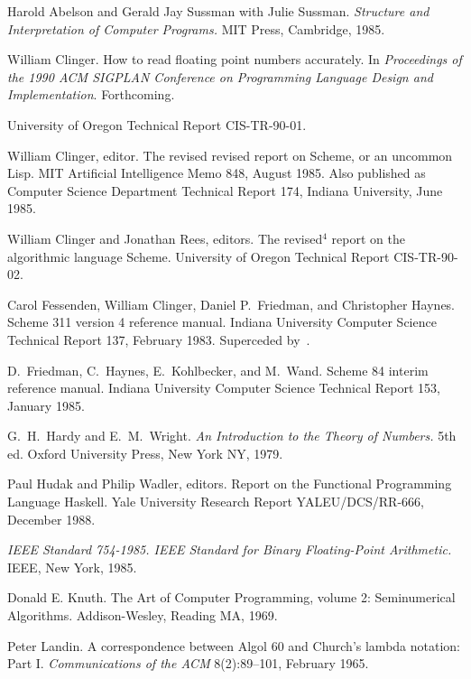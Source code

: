 \begin{thebibliography}{99}

Harold Abelson and Gerald Jay Sussman with Julie Sussman.
{\em Structure and Interpretation of Computer Programs.}
MIT Press, Cambridge, 1985.

William Clinger.
How to read floating point numbers accurately.
In {\em Proceedings of the 1990 ACM SIGPLAN Conference on Programming
  Language Design and Implementation}.  Forthcoming.

University of Oregon Technical Report CIS-TR-90-01.

William Clinger, editor.
The revised revised report on Scheme, or an uncommon Lisp.
MIT Artificial Intelligence Memo 848, August 1985.
Also published as Computer Science Department Technical Report 174,
  Indiana University, June 1985.

William Clinger and Jonathan Rees, editors.
The revised$^4$ report on the algorithmic language Scheme.
University of Oregon Technical Report CIS-TR-90-02.

Carol Fessenden, William Clinger, Daniel P.~Friedman, and Christopher Haynes.
Scheme 311 version 4 reference manual.
Indiana University Computer Science Technical Report 137, February 1983.
Superceded by~\cite{Scheme84}.

D.~Friedman, C.~Haynes, E.~Kohlbecker, and M.~Wand.
Scheme 84 interim reference manual.
Indiana University Computer Science Technical Report 153, January 1985.

G.~H.~Hardy and E.~M.~Wright.
{\em An Introduction to the Theory of Numbers.} 5th ed.
Oxford University Press, New York NY, 1979.

Paul Hudak and Philip Wadler, editors.
Report on the Functional Programming Language Haskell.
Yale University Research Report YALEU/DCS/RR-666, December 1988.

{\em IEEE Standard 754-1985.  IEEE Standard for Binary Floating-Point
Arithmetic.}  IEEE, New York, 1985.

Donald E. Knuth.
The Art of Computer Programming, volume 2: Seminumerical Algorithms.
Addison-Wesley, Reading MA, 1969.

Peter Landin.
A correspondence between Algol 60 and Church's lambda notation: Part I.
{\em Communications of the ACM} 8(2):89--101, February 1965.


\end{thebibliography}
